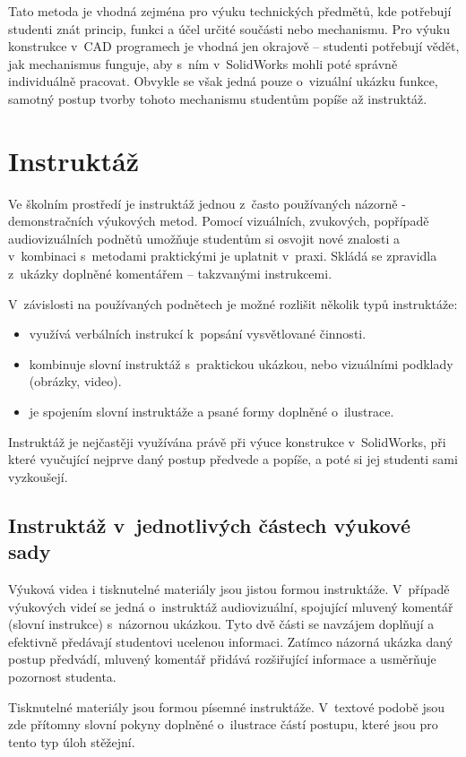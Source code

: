 Tato metoda je vhodná zejména pro výuku technických předmětů, kde potřebují studenti znát princip, funkci a účel určité součásti nebo mechanismu. 
Pro výuku konstrukce v~CAD programech je vhodná jen okrajově -- studenti potřebují vědět, jak mechanismus funguje, aby s~ním v~SolidWorks mohli poté správně individuálně pracovat.
Obvykle se však jedná pouze o~vizuální ukázku funkce, samotný postup tvorby tohoto mechanismu studentům popíše až instruktáž.

\section{Instruktáž}
Ve školním prostředí je instruktáž jednou z~často používaných názorně - demonstračních výukových metod.
Pomocí vizuálních, zvukových, popřípadě audiovizuálních podnětů umožňuje studentům si osvojit nové znalosti a v~kombinaci s~metodami praktickými je uplatnit v~praxi.
Skládá se zpravidla z~ukázky doplněné komentářem -- takzvanými instrukcemi.

\noindent V~závislosti na používaných podnětech je možné rozlišit několik typů instruktáže:
\begin{itemize}[topsep=0pt]
    \setlength\itemsep{0em}
    \item {} využívá verbálních instrukcí k~popsání vysvětlované činnosti.
    \item {} kombinuje slovní instruktáž s~praktickou ukázkou, nebo vizuálními podklady (obrázky, video).
    \item {} je spojením slovní instruktáže a psané formy doplněné o~ilustrace.
\end{itemize}

Instruktáž je nejčastěji využívána právě při výuce konstrukce v~SolidWorks, při které vyučující nejprve daný postup předvede a popíše, a poté si jej studenti sami vyzkoušejí.

\subsection{Instruktáž v~jednotlivých částech výukové sady}
Výuková videa i tisknutelné materiály jsou jistou formou instruktáže.
V~případě výukových videí se jedná o~instruktáž audiovizuální, spojující mluvený komentář (slovní instrukce) s~názornou ukázkou.
Tyto dvě části se navzájem doplňují a efektivně předávají studentovi ucelenou informaci.
Zatímco názorná ukázka daný postup předvádí, mluvený komentář přidává rozšiřující informace a usměrňuje pozornost studenta.

Tisknutelné materiály jsou formou písemné instruktáže.
V~textové podobě jsou zde přítomny slovní pokyny doplněné o~ilustrace částí postupu, které jsou pro tento typ úloh stěžejní.

\newpage
